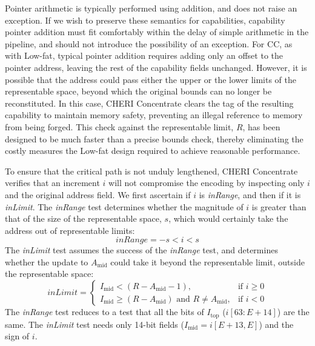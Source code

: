 Pointer arithmetic is typically performed using addition, and does not raise an exception.
If we wish to preserve these semantics for capabilities, capability pointer addition
must fit comfortably within the delay of simple arithmetic in the pipeline, and should not introduce the possibility of an exception.
For CC, as with Low-fat, typical pointer addition requires adding only an offset to the pointer address, leaving the rest of the capability fields unchanged.
However, it is possible that the address could pass either the upper or the lower limits of the representable space, beyond which the original bounds can no longer be reconstituted.
In this case, CHERI Concentrate clears the tag of the resulting capability to maintain memory safety, preventing an illegal reference to memory from being forged.
This check against the representable limit, $R$, has been designed to be much faster than a precise bounds check, thereby eliminating the costly measures the Low-fat design required to achieve reasonable performance.

To ensure that the critical path is not unduly lengthened, CHERI Concentrate verifies that an increment $i$ will not compromise the encoding by inspecting only $i$ and the original
address field. We first ascertain if
$i$ is \emph{inRange}, and then if it is \emph{inLimit}.
The \emph{inRange} test determines whether the magnitude of $i$ is greater than that of the size of the representable space, $s$,
which would certainly take the address out of representable limits:
\[ inRange = -s < i < s\]
The \emph{inLimit} test assumes the success of the \emph{inRange} test, and determines
whether the update to $A_\text{mid}$ could take it beyond the representable limit, outside the representable space:
\[
  inLimit=\begin{cases}
             I_\text{mid} < (R - A_\text{mid} - 1),& \text{if } i \geqslant 0 \\
             I_\text{mid} \geqslant (R - A_\text{mid}) \text{~and~} R \neq A_\text{mid},& \text{if } i < 0
           \end{cases}
\]
The \emph{inRange} test reduces to a test that all the bits of $I_\text{top}$ ($i[63:E+14]$) are the same.
The \emph{inLimit} test needs only 14-bit fields ($I_\text{mid}=i[E+13,E]$) and the sign of $i$.

